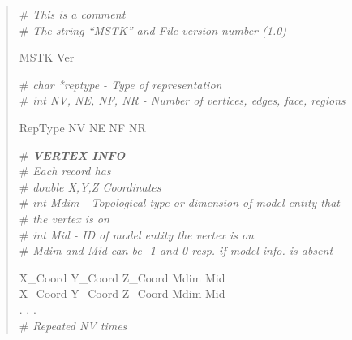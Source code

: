 \documentclass[12pt]{article}
\begin{document}
\begin{verse}
\# \textit{This is a comment} \\
\# \textit{The string ``MSTK'' and File version number (1.0)} \\
\vspace{1ex}
 
MSTK Ver %
\vspace{1ex}

\# \textit{char *reptype - Type of representation} \\  
\# \textit{\textit{int} NV, NE, NF, NR - Number of vertices, edges, face, regions} \\
\vspace{1ex}

RepType \hspace{0.5ex} NV \hspace{0.5ex} NE \hspace{0.5ex} NF \hspace{0.5ex} NR \\
\hspace{2ex}

\# \textit{\textbf{VERTEX INFO}} \\
\# \textit{Each record has} \\
\# \textit{double X,Y,Z Coordinates} \\
\# \textit{\textit{int} Mdim - Topological type or dimension of model entity that} \\
\# \textit{\hspace{4.7em} the vertex is on} \\
\# \textit{\textit{int} Mid - ID of model entity the vertex is on} \\
\# \textit{Mdim and Mid can be -1 and 0 resp. if model info. is absent} 
\vspace{1ex}

X\_Coord \hspace{0.5ex} Y\_Coord \hspace{0.5ex} Z\_Coord \hspace{0.5ex} Mdim \hspace{0.5ex} Mid \\
X\_Coord \hspace{0.5ex} Y\_Coord \hspace{0.5ex} Z\_Coord \hspace{0.5ex} Mdim \hspace{0.5ex} Mid \\
. . . \\
\# \textit{Repeated NV times}
\vspace{2ex}


\end{verse}
\end{document}
